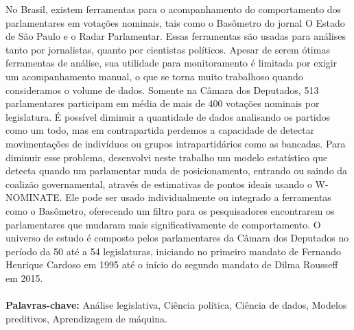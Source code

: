 No Brasil, existem ferramentas para o acompanhamento do comportamento dos
parlamentares em votações nominais, tais como o Basômetro do jornal O Estado de
São Paulo e o Radar Parlamentar. Essas ferramentas são usadas para análises
tanto por jornalistas, quanto por cientistas políticos.
Apesar de serem ótimas ferramentas de análise, sua utilidade para monitoramento
é limitada por exigir um acompanhamento manual, o que se torna muito trabalhoso
quando consideramos o volume de dados. Somente na Câmara dos Deputados, 513
parlamentares participam em média de mais de 400 votações nominais por
legislatura. É possível diminuir a quantidade de dados analisando os partidos
como um todo, mas em contrapartida perdemos a capacidade de detectar
movimentações de indivíduos ou grupos intrapartidários como as bancadas.
Para diminuir esse problema, desenvolvi neste trabalho um modelo estatístico
que detecta quando um parlamentar muda de posicionamento, entrando ou saindo da
coalizão governamental, através de estimativas de pontos ideais usando o
W-NOMINATE. Ele pode ser usado individualmente ou integrado a ferramentas como
o Basômetro, oferecendo um filtro para os pesquisadores encontrarem os
parlamentares que mudaram mais significativamente de comportamento.
O universo de estudo é composto pelos parlamentares da Câmara dos Deputados no
período da 50\textordfeminine{} até a 54\textordfeminine{} legislaturas,
iniciando no primeiro mandato de Fernando Henrique Cardoso em 1995 até o início
do segundo mandato de Dilma Rousseff em 2015.
\\
\\
\textbf{Palavras-chave:} Análise legislativa, Ciência política, Ciência de
dados, Modelos preditivos, Aprendizagem de máquina.

